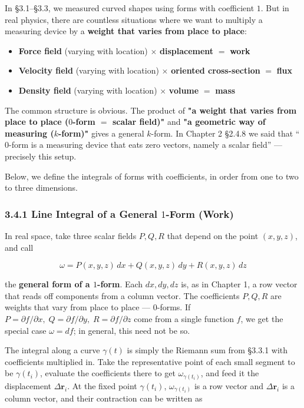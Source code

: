 In §3.1--§3.3, we measured curved shapes using forms with coefficient
\(1\). But in real physics, there are countless situations where we want
to multiply a measuring device by a
\textbf{weight that varies from place to place}:

\begin{itemize}
\item
  \textbf{Force field} (varying with location) \(\times\)
  \textbf{displacement} \(=\) \textbf{work}
\item
  \textbf{Velocity field} (varying with location) \(\times\)
  \textbf{oriented cross-section} \(=\) \textbf{flux}
\item
  \textbf{Density field} (varying with location) \(\times\)
  \textbf{volume} \(=\) \textbf{mass}
\end{itemize}

The common structure is obvious. The product of
\textbf{"a weight that varies from place to place ($0$-form $=$ scalar field)"}
and \textbf{"a geometric way of measuring ($k$-form)"} gives a general
\(k\)-form. In Chapter 2 §2.4.8 we said that ``\(0\)-form is a measuring
device that eats zero vectors, namely a scalar field'' --- precisely
this setup.

Below, we define the integrals of forms with coefficients, in order from
one to two to three dimensions.

\hypertarget{line-integral-of-a-general-1-form-work}{%
\subsubsection{\texorpdfstring{3.4.1 Line Integral of a General
\(1\)-Form
(Work)}{3.4.1 Line Integral of a General 1-Form (Work)}}\label{line-integral-of-a-general-1-form-work}}

In real space, take three scalar fields \(P, Q, R\) that depend on the
point \((x,y,z)\), and call

\[\omega = P(x,y,z)\,dx + Q(x,y,z)\,dy + R(x,y,z)\,dz\]

the \textbf{general form of a $1$-form}. Each \(dx, dy, dz\) is, as in
Chapter 1, a row vector that reads off components from a column vector.
The coefficients \(P,Q,R\) are weights that vary from place to place ---
\(0\)-forms. If
\(P=\partial f/\partial x,\;Q=\partial f/\partial y,\;R=\partial f/\partial z\)
come from a single function \(f\), we get the special case
\(\omega=df\); in general, this need not be so.

The integral along a curve \(\gamma(t)\) is simply the Riemann sum from
§3.3.1 with coefficients multiplied in. Take the representative point of
each small segment to be \(\gamma(t_i)\), evaluate the coefficients
there to get \(\omega_{\gamma(t_i)}\), and feed it the displacement
\(\Delta\mathbf{r}_i\). At the fixed point \(\gamma(t_i)\),
\(\omega_{\gamma(t_i)}\) is a row vector and \(\Delta\mathbf{r}_i\) is a
column vector, and their contraction can be written as

